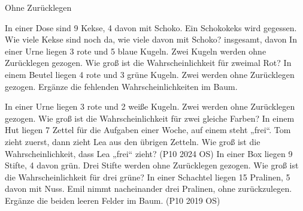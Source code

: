 \setcounter{aufgabe}{20}

\begin{aufgabe}{Ohne Zurücklegen}
\begin{teile}
\teil In einer Dose sind 9 Kekse, 4 davon mit Schoko. Ein Schokokeks wird gegessen. Wie viele Kekse sind noch da, wie viele davon mit Schoko? \leerfeld insgesamt, davon \leerfeld
\teil In einer Urne liegen 3 rote und 5 blaue Kugeln. Zwei Kugeln werden ohne Zurücklegen gezogen. Wie groß ist die Wahrscheinlichkeit für zweimal Rot?
\teil In einem Beutel liegen 4 rote und 3 grüne Kugeln. Zwei werden ohne Zurücklegen gezogen. Ergänze die fehlenden Wahrscheinlichkeiten im Baum.

\teil In einer Urne liegen 3 rote und 2 weiße Kugeln. Zwei werden ohne Zurücklegen gezogen. Wie groß ist die Wahrscheinlichkeit für zwei gleiche Farben?
\teil In einem Hut liegen 7 Zettel für die Aufgaben einer Woche, auf einem steht „frei“. Tom zieht zuerst, dann zieht Lea aus den übrigen Zetteln. Wie groß ist die Wahrscheinlichkeit, dass Lea „frei“ zieht? \hfill (P10 2024 OS)
\teil In einer Box liegen 9 Stifte, 4 davon grün. Drei Stifte werden ohne Zurücklegen gezogen. Wie groß ist die Wahrscheinlichkeit für drei grüne?
\teil In einer Schachtel liegen 15 Pralinen, 5 davon mit Nuss. Emil nimmt nacheinander drei Pralinen, ohne zurückzulegen. Ergänze die beiden leeren Felder im Baum. \hfill (P10 2019 OS)


\end{teile}
\end{aufgabe}
